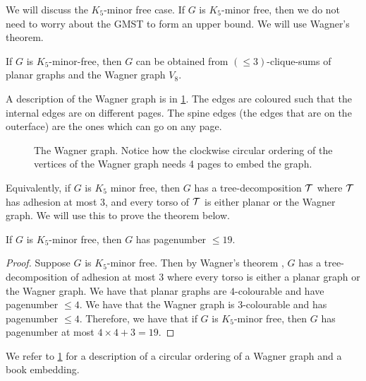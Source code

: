 We will discuss the \(K_5\)-minor free case. If \(G\) is \(K_5\)-minor free, then we do not need to worry about the GMST to form an upper bound. We will use Wagner's theorem.
\begin{theorem}\label{thm:WagnersTheorem}
	If \(G\) is \(K_5\)-minor-free, then \(G\) can be obtained from \((\leq 3)\)-clique-sums of planar graphs and the Wagner graph \(V_8\).
\end{theorem}
A description of the Wagner graph is in \cref{fig:wagner}. The edges are coloured such that the internal edges are on different pages. The spine edges (the edges that are on the outerface) are the ones which can go on any page. 
\begin{figure}[h]
	\centering
	\begin{tikzpicture}
		
	\end{tikzpicture}
	\caption{The Wagner graph. Notice how the clockwise circular ordering of the vertices of the Wagner graph needs 4 pages to embed the graph. }
	\label{fig:wagner}
\end{figure}

Equivalently, if \(G\) is \(K_5\) minor free, then \(G\) has a tree-decomposition \(\tree\) where \(\tree\) has adhesion at most 3, and every torso of \(\tree\) is either planar or the Wagner graph. We will use this to prove the theorem below. 
\begin{theorem}
	If \(G\) is \(K_5\)-minor free, then \(G\) has pagenumber \(\leq 19\).
\end{theorem}

\begin{proof}
	Suppose \(G\) is \(K_5\)-minor free. Then by Wagner's theorem \cite{wagnerUeberEigenschaftEbenen1937}, \(G\) has a tree-decomposition of adhesion at most 3 where every torso is either a planar graph or the Wagner graph.
	We have that planar graphs are \(4\)-colourable and have pagenumber \(\leq 4\). We have that the Wagner graph is \(3\)-colourable and has pagenumber \(\leq 4\). Therefore, we have that if \(G\) is \(K_5\)-minor free, then \(G\) has pagenumber at most \(4 \times 4 + 3 = 19\). 
\end{proof}
We refer to \cref{fig:wagner} for a description of a circular ordering of a Wagner graph and a book embedding. 
